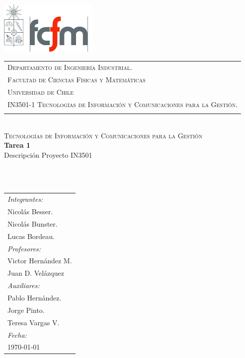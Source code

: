 \begin{titlepage}

 
\includegraphics[width=4.7cm]{logo.png} 
	\hspace{0cm}
\begin{tabular}{l}
\textsc{\color{red}Departamento de Ingeniería Industrial.}\\
\textsc{\color{gray51}Facultad de Ciencias Físicas y Matemáticas}\\
\textsc{\color{gray51}Universidad de Chile}\\
\textsc{\color{gray51}IN3501-1 Tecnologías de Información y Comunicaciones para la Gestión.}\\
  \vspace*{1.1cm}\mbox{}
  \end{tabular}
\vspace*{2 cm}
  
\begin{center}
~\\[0.5cm]
{\color{gray71}\textsc{Tecnologías de Información y Comunicaciones para la Gestión}}
\HRule~ \\[0.4cm]
{ \Huge \textup \bfseries  Tarea 1}\\[0.4cm]
{ \Large \textup{Descripción Proyecto IN3501}}\\[0.2cm]
\HRule ~\\[1cm]
\end{center}
\begin{minipage}{.5\textwidth}
~
\end{minipage}
\begin{minipage}{.5\textwidth}
\begin{flushright}
\vspace{2.5cm} %
\begin{tabular}{l}

\emph{Integrantes:}\\
{\small Nicolás Besser}.\\
{\small Nicolás Bunster.}\\
{\small Lucas Bordeau.}\\[0.3 cm]
\emph{Profesores:} \\ 
{\small Victor Hernández M.}\\
{\small Juan D. Velázquez}\\[0.3cm]
\emph{Auxiliares:} \\
{\small	Pablo Hernández.}\\
{\small	Jorge Pinto.}\\
{\small	Teresa Vargas V.}\\[0.3cm]

\emph{Fecha:}\\
{\small \today}
\end{tabular}
\end{flushright}
\end{minipage}
\end{titlepage}
%
%



%